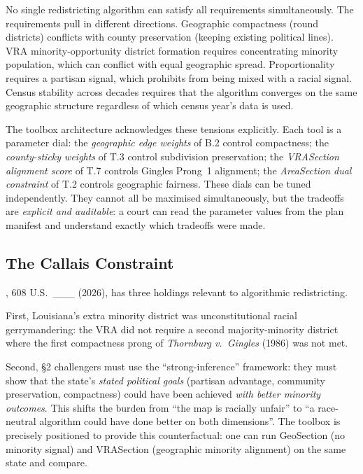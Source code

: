 No single redistricting algorithm can satisfy all requirements simultaneously.
The requirements pull in different directions.
Geographic compactness (round districts) conflicts with county preservation
(keeping existing political lines).
VRA minority-opportunity district formation requires concentrating minority
population, which can conflict with equal geographic spread.
Proportionality requires a partisan signal, which \callais{} prohibits from
being mixed with a racial signal.
Census stability across decades requires that the algorithm converges on the
same geographic structure regardless of which census year's data is used.

The toolbox architecture acknowledges these tensions explicitly.
Each tool is a parameter dial:
the \emph{geographic edge weights} of B.2 control compactness;
the \emph{county-sticky weights} of T.3 control subdivision preservation;
the \emph{VRASection alignment score} of T.7 controls Gingles Prong~1 alignment;
the \emph{AreaSection dual constraint} of T.2 controls geographic fairness.
These dials can be tuned independently.
They cannot all be maximised simultaneously, but the tradeoffs are \emph{explicit
and auditable}: a court can read the parameter values from the plan manifest and
understand exactly which tradeoffs were made.

\subsection{The Callais Constraint}

\callais{}, 608 U.S.\ \_\_\_ (2026), has three holdings relevant to algorithmic
redistricting.

First, Louisiana's extra minority district was unconstitutional racial
gerrymandering: the VRA did not require a second majority-minority district
where the first compactness prong of \emph{Thornburg v.\ Gingles} (1986) was
not met.

Second, \S2 challengers must use the ``strong-inference'' framework: they must
show that the state's \emph{stated political goals} (partisan advantage, community
preservation, compactness) could have been achieved \emph{with better minority
outcomes}.
This shifts the burden from ``the map is racially unfair'' to ``a race-neutral
algorithm could have done better on both dimensions''.
The toolbox is precisely positioned to provide this counterfactual: one can
run GeoSection (no minority signal) and VRASection (geographic minority alignment)
on the same state and compare.

